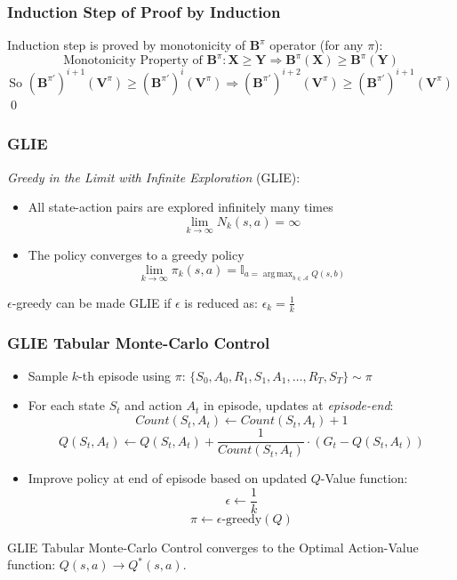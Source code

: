 \documentclass[handout]{beamer}
\DeclareMathOperator*{\argmax}{arg\,max}
\newcommand{\bvpi}{\bm{V}^{\pi}}
\begin{document}
\begin{frame}
\frametitle{Induction Step of Proof by Induction}
\pause
Induction step is proved by monotonicity of $\bm{B}^{\pi}$ operator (for any $\pi$):
\pause
$$\text{Monotonicity Property of } \bm{B}^{\pi}: \bm{X} \geq \bm{Y} \Rightarrow \bm{B}^{\pi}(\bm{X}) \geq \bm{B}^{\pi}(\bm{Y})$$
\pause
$$\text{So } (\bm{B}^{\pi'})^{i+1}(\bvpi) \geq (\bm{B}^{\pi'})^i(\bvpi) \Rightarrow (\bm{B}^{\pi'})^{i+2}(\bvpi) \geq (\bm{B}^{\pi'})^{i+1}(\bvpi)$$
\qed
\end{frame}


\begin{frame}
\frametitle{GLIE}
\pause
\begin{definition}
{\em Greedy in the Limit with Infinite Exploration} (GLIE):
\pause
\begin{itemize}[<+->]
\item  All state-action pairs are explored infinitely many times
$$\lim_{k \rightarrow \infty} N_k(s,a) = \infty$$
\item The policy converges to a greedy policy
$$\lim_{k\rightarrow \infty} \pi_k(s,a) = \mathbb{I}_{a = \argmax_{b \in \mathcal{A}} Q(s,b)}$$
\end{itemize}
\end{definition}
\pause
$\epsilon$-greedy can be made GLIE if $\epsilon$ is reduced as: $\epsilon_k = \frac 1 k$
\end{frame}

\begin{frame}
\frametitle{GLIE Tabular Monte-Carlo Control}
\pause
\begin{itemize}[<+->]
\item  Sample $k$-th episode using $\pi$: $\{S_0, A_0, R_1, S_1, A_1, \ldots, R_T, S_T\} \sim \pi$
\item For each state $S_t$ and action $A_t$ in episode, updates at {\em episode-end}:
$$Count(S_t,A_t) \leftarrow Count(S_t,A_t) + 1$$
$$Q(S_t,A_t) \leftarrow Q(S_t,A_t) + \frac 1 {Count(S_t, A_t)} \cdot (G_t - Q(S_t,A_t))$$
\item Improve policy at end of episode based on updated $Q$-Value function:
$$\epsilon \leftarrow \frac 1 k$$
$$\pi \leftarrow \epsilon \text{-greedy}(Q)$$
\end{itemize}
\pause
\begin{theorem}
GLIE Tabular Monte-Carlo Control converges to the Optimal Action-Value function: $Q(s,a) \rightarrow Q^*(s,a)$.
\end{theorem}
\end{frame}
\end{document}
